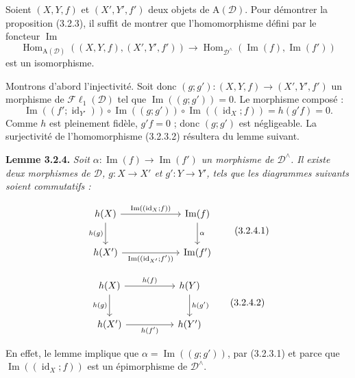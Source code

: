 \clearpage
{}%
\begingroup\small
\setlength{\parskip}{0pt}\setlength{\emergencystretch}{1.5em}

Soient $(X,Y,f)$ et $(X',Y',f')$ deux objets de $\mathrm A(\mathcal D)$.
Pour démontrer la proposition (3.2.3), il suffit de montrer que
l'homomorphisme défini par le foncteur $\operatorname{Im}$
\[
\operatorname{Hom}_{\mathrm A(\mathcal D)}((X,Y,f),(X',Y',f'))
\longrightarrow
\operatorname{Hom}_{\mathcal D^\wedge}(\operatorname{Im}(f),\operatorname{Im}(f'))
\tag{3.2.3.2}
\]
est un isomorphisme.

Montrons d'abord l'injectivité. Soit donc
$(g;g')\colon(X,Y,f)\to(X',Y',f')$ un morphisme de
$\mathcal{F}\ell_1(\mathcal D)$ tel que
$\operatorname{Im}((g;g'))=0$. Le morphisme composé :
\[
\operatorname{Im}((f';\operatorname{id}_{Y'}))\circ
\operatorname{Im}((g;g'))\circ
\operatorname{Im}((\operatorname{id}_X;f))=h(g'f)=0.
\]
Comme $h$ est pleinement fidèle, $g'f=0$ ; donc $(g;g')$ est négligeable.
La surjectivité de l'homomorphisme (3.2.3.2) résultera du lemme suivant.

\medskip\noindent\textbf{Lemme 3.2.4.}\quad
\textit{Soit
$\alpha\colon\operatorname{Im}(f)\to\operatorname{Im}(f')$ un morphisme de
$\mathcal D^\wedge$. Il existe deux morphismes de $\mathcal D$,
$g\colon X\to X'$ et $g'\colon Y\to Y'$, tels que les diagrammes suivants
soient commutatifs :}

\[
\begin{tikzcd}[column sep=6em,row sep=2.3em]
h(X)\arrow[r,"\operatorname{Im}((\operatorname{id}_X;f))"]\arrow[d,"h(g)"']&
\operatorname{Im}(f)\arrow[d,"\alpha"]\\
h(X')\arrow[r,"\operatorname{Im}((\operatorname{id}_{X'};f'))"']&
\operatorname{Im}(f')
\end{tikzcd}
\tag{3.2.4.1}
\]

\[
\begin{tikzcd}[column sep=5em,row sep=2.3em]
h(X)\arrow[r,"h(f)"]\arrow[d,"h(g)"']&h(Y)\arrow[d,"h(g')"]\\
h(X')\arrow[r,"h(f')"']&h(Y')
\end{tikzcd}
\tag{3.2.4.2}
\]

En effet, le lemme implique que
$\alpha=\operatorname{Im}((g;g'))$, par (3.2.3.1) et parce que
$\operatorname{Im}((\operatorname{id}_X;f))$ est un épimorphisme de
$\mathcal D^\wedge$.
\endgroup
